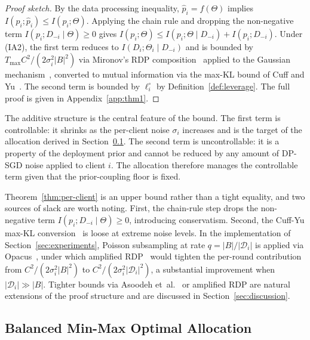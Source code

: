 \documentclass[letterpaper,journal]{IEEEtran}
\begin{document}
\begin{proof}[Proof sketch]
By the data processing inequality, $\hat{p}_i = f(\Theta)$ implies
$I(p_i;\hat{p}_i) \leq I(p_i;\Theta)$. Applying the chain rule and
dropping the non-negative term $I(p_i; D_{-i} \mid \Theta) \geq 0$
gives $I(p_i;\Theta) \leq I(p_i;\Theta \mid D_{-i}) + I(p_i;D_{-i})$.
Under (IA2), the first term reduces to $I(D_i;\Theta_i \mid D_{-i})$
and is bounded by $T_{\max} C^2/(2\sigma_i^2 |B|^2)$ via
Mironov's RDP composition~\cite{mironov2017rdp} applied to the
Gaussian mechanism~\cite{abadi2016dpsgd}, converted to mutual
information via the max-KL bound of Cuff and
Yu~\cite{cuff2016mi}. The second term is bounded by $\ell_i^\circ$
by Definition~\ref{def:leverage}. The full proof is given in
Appendix~\ref{app:thm1}.
\end{proof}

The additive structure is the central feature of the bound. The
first term is controllable: it shrinks as the per-client noise
$\sigma_i$ increases and is the target of the allocation derived in
Section~\ref{sec:defense-thm2}. The second term is uncontrollable:
it is a property of the deployment prior and cannot be reduced by
any amount of DP-SGD noise applied to client $i$. The allocation
therefore manages the controllable term given that the
prior-coupling floor is fixed.

Theorem~\ref{thm:per-client} is an upper bound rather than a tight
equality, and two sources of slack are worth noting. First, the
chain-rule step drops the non-negative term $I(p_i; D_{-i} \mid
\Theta) \geq 0$, introducing conservatism. Second, the Cuff-Yu
max-KL conversion~\cite{cuff2016mi} is loose at extreme noise
levels. In the implementation of Section~\ref{sec:experiments},
Poisson subsampling at rate $q = |B|/|\mathcal{D}_i|$ is applied
via Opacus~\cite{yousefpour2021opacus}, under which amplified
RDP~\cite{wang2019subsampled} would tighten the per-round
contribution from $C^2/(2\sigma_i^2|B|^2)$ to
$C^2/(2\sigma_i^2|\mathcal{D}_i|^2)$, a substantial improvement
when $|\mathcal{D}_i| \gg |B|$. Tighter bounds via Asoodeh
et~al.~\cite{asoodeh2021variants} or amplified RDP are natural
extensions of the proof structure and are discussed in Section~\ref{sec:discussion}.

\subsection{Balanced Min-Max Optimal Allocation}
\label{sec:defense-thm2}
\end{document}
